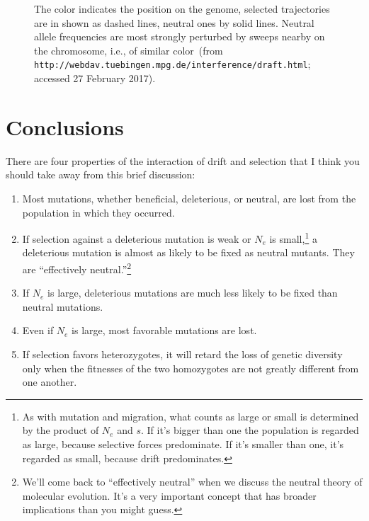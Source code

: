 \begin{figure}
\begin{center}
\end{center}
\caption{The color indicates the position on the genome, selected
  trajectories are in shown as dashed lines, neutral ones by solid
  lines. Neutral allele frequencies are most strongly perturbed by
  sweeps nearby on the chromosome, i.e., of similar color~(from
  {\tt http://webdav.tuebingen.mpg.de/interference/draft.html};
  accessed 27 February 2017).}\label{fig:genetic-draft}  
\end{figure}

\section*{Conclusions}

There are four properties of the interaction of drift and selection
that I think you should take away from this brief
discussion:

\begin{enumerate}

\item Most mutations, whether beneficial, deleterious, or neutral, are
  lost from the population in which they occurred.

\item If selection against a deleterious mutation is weak or $N_e$ is
  small,\footnote{As with mutation and migration, what counts as large
    or small is determined by the product of $N_e$ and $s$. If it's
    bigger than one the population is regarded as large, because
    selective forces predominate. If it's smaller than one, it's
    regarded as small, because drift predominates.} a deleterious
  mutation is almost as likely to be fixed as neutral mutants. They
  are ``effectively neutral.''\footnote{We'll
    come back to ``effectively neutral'' when we discuss the neutral
    theory of molecular evolution. It's a very important concept that
    has broader implications than you might guess.}

\item If $N_e$ is large, deleterious mutations are much less likely to
  be fixed than neutral mutations.

\item Even if $N_e$ is large, most favorable mutations are lost.

\item If selection favors heterozygotes, it will retard the loss of
  genetic diversity only when the fitnesses of the two homozygotes are
  not greatly different from one another.

\end{enumerate}

